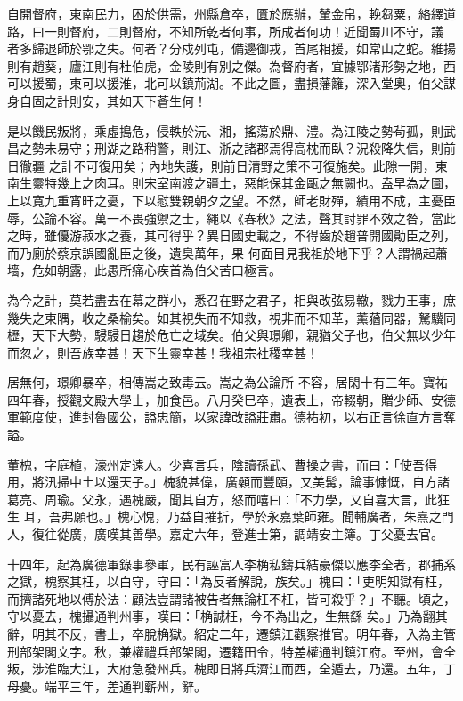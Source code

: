 \begin{pinyinscope}
 自開督府，東南民力，困於供需，州縣倉卒，匱於應辦，輦金帛，輓芻粟，絡繹道路，曰一則督府，二則督府，不知所乾者何事，所成者何功！近聞蜀川不守，議
 者多歸退師於鄂之失。何者？分戍列屯，備邊御戎，首尾相援，如常山之蛇。維揚則有趙葵，廬江則有杜伯虎，金陵則有別之傑。為督府者，宜據鄂渚形勢之地，西可以援蜀，東可以援淮，北可以鎮荊湖。不此之圖，盡損藩籬，深入堂奧，伯父謀身自固之計則安，其如天下蒼生何！



 是以饑民叛將，乘虛搗危，侵軼於沅、湘，搖蕩於鼎、澧。為江陵之勢茍孤，則武昌之勢未易守；刑湖之路稍警，則江、浙之諸郡焉得高枕而臥？況殺降失信，則前日徹疆
 之計不可復用矣；內地失護，則前日清野之策不可復施矣。此隙一開，東南生靈特幾上之肉耳。則宋室南渡之疆土，惡能保其金甌之無闕也。盍早為之圖，上以寬九重宵旰之憂，下以慰雙親朝夕之望。不然，師老財殫，績用不成，主憂臣辱，公論不容。萬一不畏強禦之士，繩以《春秋》之法，聲其討罪不效之咎，當此之時，雖優游菽水之養，其可得乎？異日國史載之，不得齒於趙普開國勛臣之列，而乃廁於蔡京誤國亂臣之後，遺臭萬年，果
 何面目見我祖於地下乎？人謂禍起蕭墻，危如朝露，此愚所痛心疾首為伯父苦口極言。



 為今之計，莫若盡去在幕之群小，悉召在野之君子，相與改弦易轍，戮力王事，庶幾失之東隅，收之桑榆矣。如其視失而不知救，視非而不知革，薰蕕同器，駑驥同櫪，天下大勢，駸駸日趨於危亡之域矣。伯父與璟卿，親猶父子也，伯父無以少年而忽之，則吾族幸甚！天下生靈幸甚！我祖宗社稷幸甚！



 居無何，璟卿暴卒，相傳嵩之致毒云。嵩之為公論所
 不容，居閑十有三年。寶祐四年春，授觀文殿大學士，加食邑。八月癸巳卒，遺表上，帝輟朝，贈少師、安德軍範度使，進封魯國公，謚忠簡，以家諱改謚莊肅。德祐初，以右正言徐直方言奪謚。



 董槐，字庭植，濠州定遠人。少喜言兵，陰讀孫武、曹操之書，而曰：「使吾得用，將汛掃中土以還天子。」槐貌甚偉，廣顙而豐頤，又美髯，論事慷慨，自方諸葛亮、周瑜。父永，遇槐嚴，聞其自方，怒而嘻曰：「不力學，又自喜大言，此狂生
 耳，吾弗願也。」槐心愧，乃益自摧折，學於永嘉葉師雍。聞輔廣者，朱熹之門人，復往從廣，廣嘆其善學。嘉定六年，登進士第，調靖安主簿。丁父憂去官。



 十四年，起為廣德軍錄事參軍，民有誣富人李桷私鑄兵結豪傑以應李全者，郡捕系之獄，槐察其枉，以白守，守曰：「為反者解說，族矣。」槐曰：「吏明知獄有枉，而擠諸死地以傅於法：顧法豈謂諸被告者無論枉不枉，皆可殺乎？」不聽。頃之，守以憂去，槐攝通判州事，嘆曰：「桷誠枉，今不為出之，生無繇
 矣。」乃為翻其辭，明其不反，書上，卒脫桷獄。紹定二年，遷鎮江觀察推官。明年春，入為主管刑部架閣文字。秋，兼權禮兵部架閣，遷籍田令，特差權通判鎮江府。至州，會全叛，涉淮臨大江，大府急發州兵。槐即日將兵濟江而西，全遁去，乃還。五年，丁母憂。端平三年，差通判蘄州，辭。




\end{pinyinscope}
